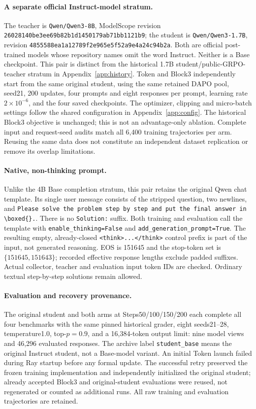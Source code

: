 \paragraph{A separate official Instruct-model stratum.}
The teacher is \texttt{Qwen/Qwen3-8B}, ModelScope revision
\texttt{26028140be3ee69b82b1d1450179ab71bb1121b9}; the student is
\texttt{Qwen/Qwen3-1.7B}, revision \texttt{4855588ea1a12789f2e965e5f52a9e4a24c94b2a}.
Both are official post-trained models whose repository names omit the word Instruct.
Neither is a Base checkpoint. This pair is distinct from the historical 1.7B
student/public-GRPO-teacher stratum in Appendix~\ref{app:history}.
Token and Block3 independently start from the same original student, using the
same retained DAPO pool, seed21, 200 updates, four prompts and eight responses per
prompt, learning rate $2\times10^{-6}$, and the four saved checkpoints.
The optimizer, clipping and micro-batch settings follow the shared configuration
in Appendix~\ref{app:config}. The historical Block3 objective is unchanged; this
is not an advantage-only ablation. Complete input and request-seed audits match
all 6,400 training trajectories per arm. Reusing the same data does not constitute
an independent dataset replication or remove its overlap limitations.

\paragraph{Native, non-thinking prompt.}
Unlike the 4B Base completion stratum, this pair retains the original Qwen chat
template. Its single user message consists of the stripped question, two newlines,
and \texttt{Please solve the problem step by step and put the final answer in}
\verb|\boxed{}.|. There is no \texttt{Solution:} suffix. Both training and evaluation
call the template with \texttt{enable\_thinking=False} and
\texttt{add\_generation\_prompt=True}. The resulting empty, already-closed
\texttt{<think>...</think>} control prefix is part of the input, not generated reasoning.
EOS is 151645 and the stop-token set is $\{151645,151643\}$; recorded effective
response lengths exclude padded suffixes. Actual collector, teacher and evaluation
input token IDs are checked. Ordinary textual step-by-step solutions remain allowed.

\paragraph{Evaluation and recovery provenance.}
The original student and both arms at Steps50/100/150/200 each complete all four
benchmarks with the same pinned historical grader, eight seeds21--28,
temperature1.0, top-$p=0.9$, and a 16,384-token output limit: nine model views and
46,296 evaluated responses. The archive label \texttt{student\_base} means the
original Instruct student, not a Base-model variant. An initial Token launch failed
during Ray startup before any formal update. The successful retry preserved the
frozen training implementation and independently initialized the original student;
already accepted Block3 and original-student evaluations were reused, not regenerated
or counted as additional runs. All raw training and evaluation trajectories are retained.

